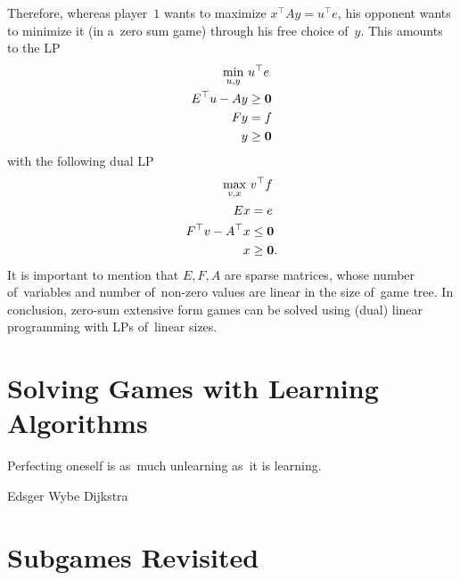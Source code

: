 \clearpage
\todo

Therefore, whereas player~$1$ wants to maximize $x^\top Ay = u^\top e$, his opponent wants to minimize it (in a~zero sum game) through his free choice of~$y$.
This amounts to the LP
\begin{equation}
\label{seq-dual}
\begin{split}
    \min_{u, y}\  &u^\top e \\
    E^\top u - Ay &\ge \boldsymbol{0} \\
    Fy &= f \\
    y &\ge \boldsymbol{0}
\end{split}
\end{equation}
with the following dual LP
\begin{equation}
\label{seq-primal}
\begin{split}
    \max_{v, x}\  &v^\top f \\
    Ex &= e \\
    F^\top v - A^\top x &\le \boldsymbol{0} \\
    x &\ge \boldsymbol{0}.
\end{split}
\end{equation}
It is important to mention that $E, F, A$ are sparse matrices, whose number of~variables and number of~non-zero values are linear in the size of~game tree.
In conclusion, zero-sum extensive form games can be solved using (dual) linear programming with LPs of~linear sizes.

\section{Solving Games with Learning Algorithms}
{
  \setlength{\epigraphwidth}{0.65\textwidth}
  \epigraph{
    Perfecting oneself is as~much unlearning as~it is learning.
  }{Edsger Wybe Dijkstra}
}%
\todo

\section{Subgames Revisited}

